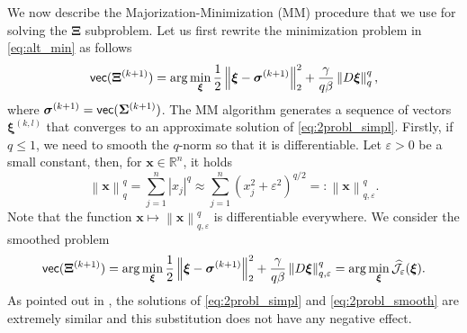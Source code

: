 \documentclass[final,leqno]{siamltex}
\newcommand{\R}{{\mathbb R}}
\newcommand{\ts}[1]{\mbox{\textsf{#1}}}
\newcommand{\norm}[1]{\left\| #1 \right\|}
\newcommand{\sigmab}{\boldsymbol{\sigma}}
\newcommand{\xib}{\boldsymbol{\xi}}
\newcommand{\Sigmab}{\mathbf{\Sigma}}
\begin{document}
We now describe the Majorization-Minimization (MM) procedure that we use for solving the $\mathbf{\Xi}$ subproblem. Let us first rewrite the minimization problem in \eqref{eq:alt_min} as follows
\begin{equation}\label{eq:2probl_simpl}
\ts{vec}(\mathbf{\Xi}^{(k+1)})=\arg\min_{\xib}\frac{1}{2}\norm{\xib-\sigmab^{(k+1)}}_2^2+\frac{\gamma}{q\beta}\norm{{D}\xib}_q^q,
\end{equation}
where $\sigmab^{(k+1)}=\ts{vec}(\Sigmab^{(k+1)})$. The MM algorithm generates a sequence of vectors $\xib^{(k,l)}$ that converges to an approximate solution of \eqref{eq:2probl_simpl}. Firstly, if $q\leq 1$, we need to smooth the $q$-norm so that it is differentiable. Let $\varepsilon>0$ be a small constant, then, for $\mathbf{x}\in\R^n$, it holds
$$
\norm{\mathbf{x}}_q^q=\sum_{j=1}^n |x_j|^q\approx\sum_{j=1}^n \left(x_j^2+\varepsilon^2\right)^{q/2}=:\norm{\mathbf{x}}_{q,\varepsilon}^q.
$$
Note that the function $\mathbf{x}\mapsto\norm{\mathbf{x}}_{q,\varepsilon}^q$ is differentiable everywhere. We consider the smoothed problem
\begin{equation}\label{eq:2probl_smooth}
\ts{vec}(\mathbf\Xi^{(k+1)})=\arg\min_{\xib}\frac{1}{2}\norm{\xib-{\sigmab}^{(k+1)}}_2^2+\frac{\gamma}{q\beta}\norm{{D}\xib}_{q,\varepsilon}^q=\arg\min_{\xib}\widehat{\mathcal{J}}_\varepsilon(\mathbf{\xib}).
\end{equation}
As pointed out in \cite{BR19}, the solutions of \eqref{eq:2probl_simpl} and \eqref{eq:2probl_smooth} are extremely similar and this substitution does not have any negative effect.
\end{document}
